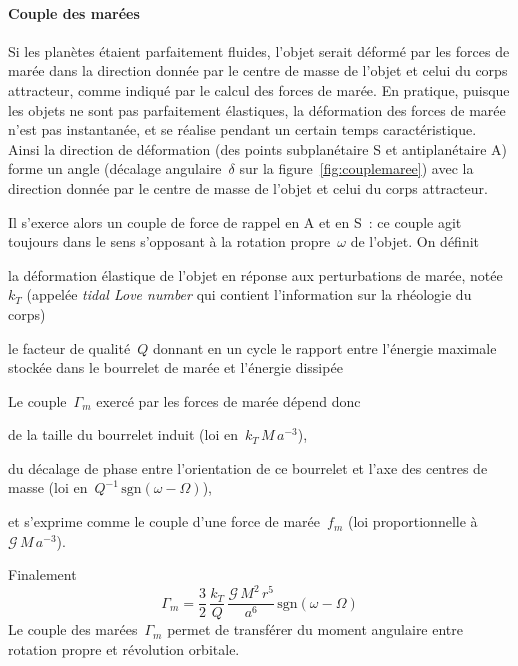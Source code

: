 

\sk
\paragraph{Couple des marées} Si les planètes étaient parfaitement fluides, l'objet serait déformé par les forces de marée dans la direction donnée par le centre de masse de l'objet et celui du corps attracteur, comme indiqué par le calcul des forces de marée. En pratique, puisque les objets ne sont pas parfaitement élastiques, la déformation des forces de marée n'est pas instantanée, et se réalise pendant un certain temps caractéristique. Ainsi la direction de déformation (des points subplanétaire S et antiplanétaire A) forme un angle (décalage angulaire~$\delta$ sur la figure~\ref{fig:couplemaree}) avec la direction donnée par le centre de masse de l'objet et celui du corps attracteur. 

\sk
Il s'exerce alors un couple de force de rappel en A et en S~: ce couple agit toujours dans le sens s'opposant à la rotation propre~$\omega$ de l'objet. On définit 
\begin{citemize}
\item la déformation élastique de l'objet en réponse aux perturbations de marée, notée $k_T$ (appelée \emph{tidal Love number} qui contient l'information sur la rhéologie du corps)
\item le facteur de qualité~$Q$ donnant en un cycle le rapport entre l'énergie maximale stockée dans le bourrelet de marée et l'énergie dissipée  
\end{citemize}
\noindent Le couple~$\Gamma_m$ exercé par les forces de marée dépend donc 
\begin{citemize}
\item de la taille du bourrelet induit (loi en~$k_T \, M \, a^{-3}$), 
\item du décalage de phase entre l'orientation de ce bourrelet et l'axe des centres de masse (loi en~$Q^{-1}\,\textrm{sgn}(\omega-\Omega)$), 
\item et s'exprime comme le couple d'une force de marée~$f_m$ (loi proportionnelle à~$\mathcal{G}\,M\,a^{-3}$). 
\end{citemize}
Finalement
\[ \Gamma_m = \frac{3}{2} \, \frac{k_T}{Q} \, \frac{\mathcal{G}\,M^2\,r^5}{a^6} \, \textrm{sgn}(\omega-\Omega) \]
\noindent Le couple des marées~$\Gamma_m$ permet de transférer du moment angulaire entre rotation propre et révolution orbitale.

